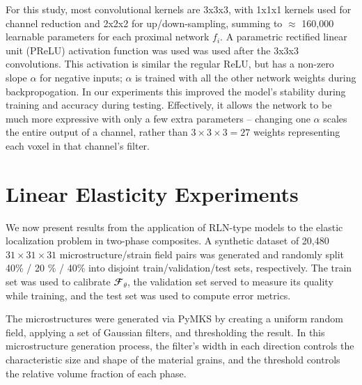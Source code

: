 \documentclass[3p, preprint]{elsarticle}
\newcommand{\Ftheta}{\mathbfcal{F}_\theta}
\newenvironment{revision} {} {}
\begin{document}
For this study, most convolutional kernels are 3x3x3, with 1x1x1 kernels used for channel reduction and 2x2x2 for up/down-sampling, summing to $\approx$ 160,000 learnable parameters for each proximal network $f_i$. A parametric rectified linear unit (PReLU) activation function \cite{he2015_prelu} was used was used after the 3x3x3 convolutions. This activation is similar the regular ReLU, but has a non-zero slope $\alpha$ for negative inputs; $\alpha$ is trained with all the other network weights during backpropogation. In our experiments this improved the model's stability during training and accuracy during testing. Effectively, it allows the network to be much more expressive with only a few extra parameters -- changing one $\alpha$ scales the entire output of a channel, rather than $3 \times 3 \times 3=27$ weights representing each voxel in that channel's filter. 

\section{Linear Elasticity Experiments}\label{sec:experiments}

We now present results from the application of RLN-type models to the elastic localization problem in two-phase composites. A synthetic dataset of 20,480 $31 \times 31 \times 31$ microstructure/strain field pairs was generated and randomly split 40\% / 20 \% / 40\% into \begin{revision}disjoint\end{revision} train/validation/test sets, respectively. The train set was used to calibrate $\Ftheta$, the validation set served to measure its quality while training, and the test set was used to compute error metrics.

The microstructures were generated via PyMKS \cite{brough2016_mks} by creating a uniform random field, applying \begin{revision}a set of Gaussian filters\end{revision}, and thresholding the result. In this microstructure generation process, the filter's width in each direction controls the characteristic size and shape of the material grains, and the threshold controls the relative volume fraction of each phase. 
\end{document}
